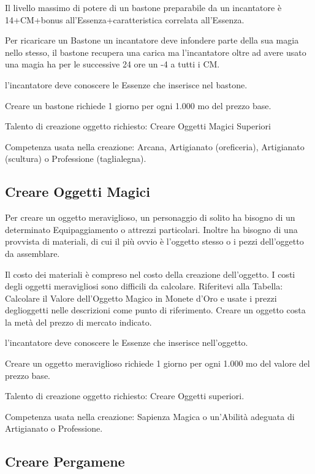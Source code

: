\documentclass[a4paper,11pt,twoside,openany]{book}
\begin{document}
Il livello massimo di potere di un bastone preparabile da un incantatore è 14+CM+bonus all'Essenza+caratteristica correlata all'Essenza.

Per ricaricare un Bastone un incantatore deve infondere parte della sua magia nello stesso, il bastone recupera una carica ma l'incantatore oltre ad avere usato una magia ha per le successive 24 ore un -4 a tutti i CM.

l'incantatore deve conoscere le Essenze che inserisce nel bastone.

Creare un bastone richiede 1 giorno per ogni 1.000 mo del prezzo base.

Talento di creazione oggetto richiesto: Creare Oggetti Magici Superiori

Competenza usata nella creazione: Arcana, Artigianato (oreficeria), Artigianato (scultura) o Professione (taglialegna).

\pagebreak

\subsection{Creare Oggetti Magici}

Per creare un oggetto meraviglioso, un personaggio di solito ha bisogno di un determinato Equipaggiamento o attrezzi particolari. Inoltre ha bisogno di una provvista di materiali, di cui il più ovvio è l'oggetto stesso o i pezzi dell'oggetto da assemblare.

Il costo dei materiali è compreso nel costo della creazione dell'oggetto. I costi degli oggetti meravigliosi sono difficili da calcolare. Riferitevi alla Tabella: Calcolare il Valore dell'Oggetto Magico in Monete d'Oro e usate i prezzi deglioggetti nelle descrizioni come punto di riferimento. Creare un oggetto costa la metà del prezzo di mercato indicato.

l'incantatore deve conoscere le Essenze che inserisce nell'oggetto.

Creare un oggetto meraviglioso richiede 1 giorno per ogni 1.000 mo del valore del prezzo base.

Talento di creazione oggetto richiesto: Creare Oggetti superiori.

Competenza usata nella creazione: Sapienza Magica o un'Abilità adeguata
di Artigianato o Professione.

\subsection{Creare Pergamene}
\end{document}
